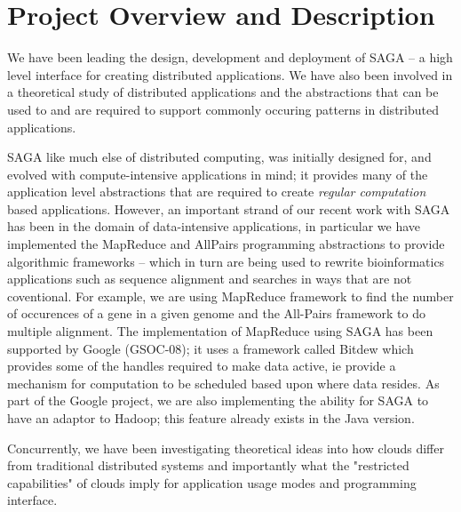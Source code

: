 \documentclass[10pt,letterpaper]{article}
\begin{document}



\setcounter{page}{1}
\pagestyle{plain} 
\normalsize


\section{Project Overview and Description}


We have been leading the design, development and deployment of SAGA -- a high level
interface for creating distributed applications.  We have also been involved in
a theoretical study of distributed applications and the abstractions that can be used to
and are required to support commonly occuring patterns in distributed applications.

SAGA like much else of distributed computing, was initially designed for, and evolved with 
compute-intensive applications in mind; it provides many of the application level
abstractions that are required to create {\it regular computation} based applications.
However, an important  strand of our recent work with SAGA has been in the domain of
data-intensive applications, in particular we have implemented the
MapReduce and AllPairs  programming abstractions to provide 
algorithmic frameworks -- which in turn are being used to rewrite  bioinformatics applications
such as sequence alignment and searches in ways that are not coventional.
For example, we are using MapReduce framework to find the number of occurences of a gene in 
a given genome and the All-Pairs framework to do multiple alignment.
The implementation of MapReduce using SAGA has been supported by Google (GSOC-08); it uses a
framework called Bitdew which provides some of the handles required to make data
active, ie provide a mechanism for computation to be scheduled based upon where
data resides. As part of the Google project, we are also implementing the ability for SAGA to have an adaptor to Hadoop; this feature already exists in the Java version. 

Concurrently, we have been investigating theoretical ideas into how clouds differ
from traditional distributed systems and importantly what the "restricted capabilities"
of clouds imply for application usage modes and programming interface. 
\end{document}
